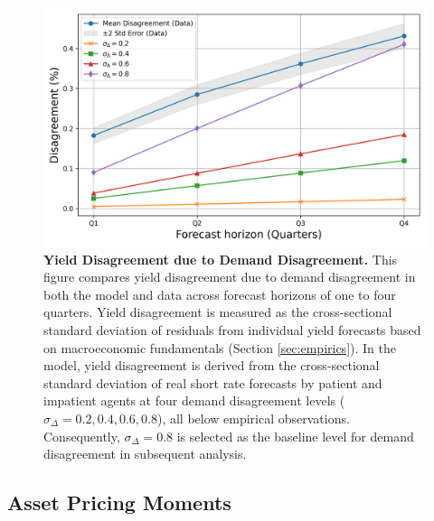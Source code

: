 \documentclass[preprint,11pt,authoryear]{elsarticle}
\theoremstyle{plain}
\begin{document}
\begin{figure}[htbp]
\centering
\vspace{0.1in}
\includegraphics[width=.5\textwidth]{figuresJFE/MeanDisagreementDataAndModel.png} 
\caption{\textbf{Yield Disagreement due to Demand Disagreement.} This figure compares yield disagreement due to demand disagreement in both the model and data across forecast horizons of one to four quarters. Yield disagreement is measured as the cross-sectional standard deviation of residuals from individual yield forecasts based on macroeconomic fundamentals (Section \ref{sec:empirics}). In the model, yield disagreement is derived from the cross-sectional standard deviation of real short rate forecasts by patient and impatient agents at four demand disagreement levels ($\sigma_{\Delta}= 0.2, 0.4, 0.6, 0.8$), all below empirical observations. Consequently, $\sigma_{\Delta}=0.8$ is selected as the baseline level for demand disagreement in subsequent analysis.} \label{fig:DemandDisagreementYieldModelAndData} 
\end{figure}

 

 
\subsection{Asset Pricing Moments}\label{sec:APmoments}  
\end{document}
